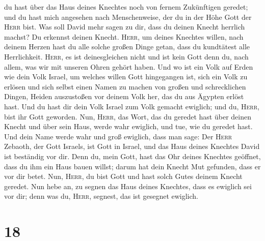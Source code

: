 du hast über das Haus deines Knechtes noch von fernem Zukünftigen
geredet; und du hast mich angesehen nach Menschenweise, der du in der
Höhe Gott der \textsc{Herr} bist.  Was soll David mehr
sagen zu dir, dass du deinen Knecht herrlich machst? Du erkennst deinen
Knecht.  \textsc{Herr}, um deines Knechtes willen, nach
deinem Herzen hast du alle solche großen Dinge getan, dass du kundtätest
alle Herrlichkeit.  \textsc{Herr}, es ist deinesgleichen
nicht und ist kein Gott denn du, nach allem, was wir mit unseren Ohren
gehört haben.  Und wo ist ein Volk auf Erden wie dein
Volk Israel, um welches willen Gott hingegangen ist, sich ein Volk zu
erlösen und sich selbst einen Namen zu machen von großen und
schrecklichen Dingen, Heiden auszustoßen vor deinem Volk her, das du aus
Ägypten erlöst hast.  Und du hast dir dein Volk Israel
zum Volk gemacht ewiglich; und du, \textsc{Herr}, bist ihr Gott
geworden.  Nun, \textsc{Herr}, das Wort, das du geredet
hast über deinen Knecht und über sein Haus, werde wahr ewiglich, und
tue, wie du geredet hast.  Und dein Name werde wahr und
groß ewiglich, dass man sage: Der \textsc{Herr} Zebaoth, der Gott
Israels, ist Gott in Israel, und das Haus deines Knechtes David ist
beständig vor dir.  Denn du, mein Gott, hast das Ohr
deines Knechtes geöffnet, dass du ihm ein Haus bauen willst; darum hat
dein Knecht Mut gefunden, dass er vor dir betet.  Nun,
\textsc{Herr}, du bist Gott und hast solch Gutes deinem Knecht geredet.
 Nun hebe an, zu segnen das Haus deines Knechtes, dass es
ewiglich sei vor dir; denn was du, \textsc{Herr}, segnest, das ist
gesegnet ewiglich.

\hypertarget{section-17}{%
\section{18}\label{section-17}}

